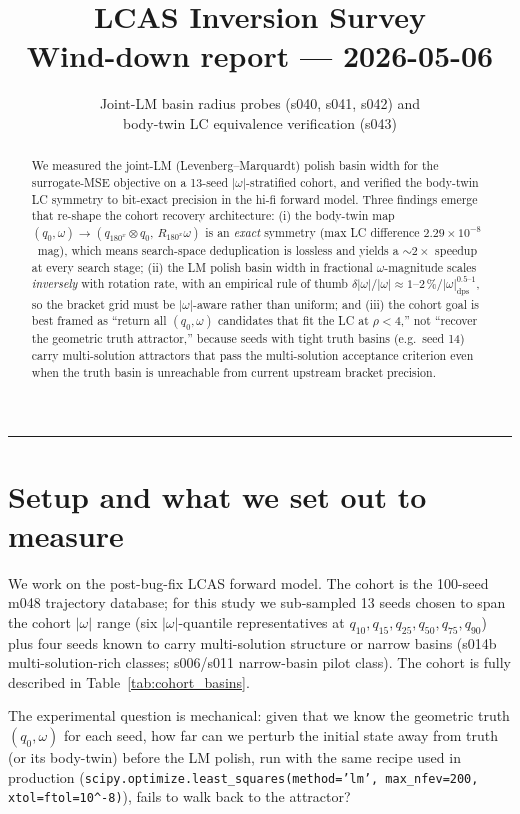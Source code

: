 \documentclass[11pt,a4paper]{article}
\title{LCAS Inversion Survey \\ \large{Wind-down report — 2026-05-06}}
\author{Joint-LM basin radius probes (s040, s041, s042) and \\ body-twin LC equivalence verification (s043)}
\date{}
\begin{document}
\maketitle

\begin{abstract}
\noindent We measured the joint-LM (Levenberg--Marquardt) polish basin width for the surrogate-MSE objective on a 13-seed $|\omega|$-stratified cohort, and verified the body-twin LC symmetry to bit-exact precision in the hi-fi forward model. Three findings emerge that re-shape the cohort recovery architecture: (i) the body-twin map $(q_0, \omega) \to (q_{180^x} \otimes q_0,\, R_{180^x} \omega)$ is an \emph{exact} symmetry (max LC difference $2.29\times 10^{-8}$~mag), which means search-space deduplication is lossless and yields a $\sim 2\times$ speedup at every search stage; (ii) the LM polish basin width in fractional $\omega$-magnitude scales \emph{inversely} with rotation rate, with an empirical rule of thumb $\delta|\omega|/|\omega| \approx 1\text{--}2\,\%/|\omega|_{\mathrm{dps}}^{0.5\text{--}1}$, so the bracket grid must be $|\omega|$-aware rather than uniform; and (iii) the cohort goal is best framed as ``return all $(q_0, \omega)$ candidates that fit the LC at $\rho < 4$,'' not ``recover the geometric truth attractor,'' because seeds with tight truth basins (e.g.\ seed 14) carry multi-solution attractors that pass the multi-solution acceptance criterion even when the truth basin is unreachable from current upstream bracket precision.
\end{abstract}

\tableofcontents
\bigskip\hrule\bigskip

\section{Setup and what we set out to measure}
\label{sec:setup}

We work on the post-bug-fix LCAS forward model. The cohort is the 100-seed m048 trajectory database; for this study we sub-sampled 13 seeds chosen to span the cohort $|\omega|$ range (six $|\omega|$-quantile representatives at $q_{10}, q_{15}, q_{25}, q_{50}, q_{75}, q_{90}$) plus four seeds known to carry multi-solution structure or narrow basins (s014b multi-solution-rich classes; s006/s011 narrow-basin pilot class). The cohort is fully described in Table~\ref{tab:cohort_basins}.

The experimental question is mechanical: given that we know the geometric truth $(q_0, \omega)$ for each seed, how far can we perturb the initial state away from truth (or its body-twin) before the LM polish, run with the same recipe used in production (\texttt{scipy.optimize.least\_squares(method='lm', max\_nfev=200, xtol=ftol=10^{-8})}), fails to walk back to the attractor?
\end{document}
